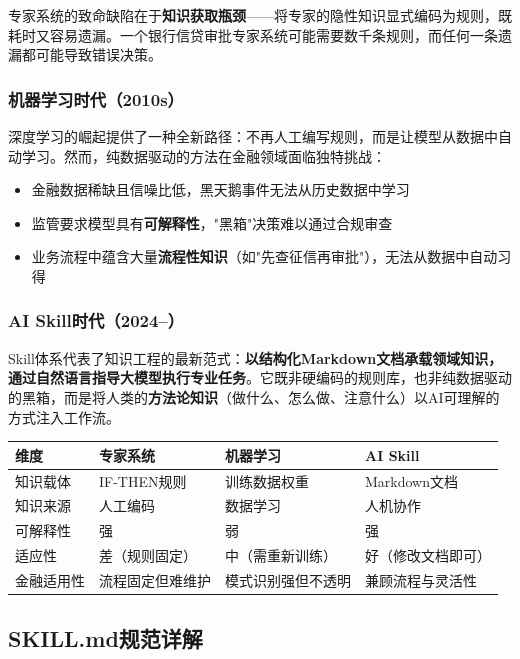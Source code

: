 专家系统的致命缺陷在于\textbf{知识获取瓶颈}——将专家的隐性知识显式编码为规则，既耗时又容易遗漏。一个银行信贷审批专家系统可能需要数千条规则，而任何一条遗漏都可能导致错误决策。

\subsubsection{机器学习时代（2010s）}

深度学习的崛起提供了一种全新路径：不再人工编写规则，而是让模型从数据中自动学习。然而，纯数据驱动的方法在金融领域面临独特挑战：
\begin{itemize}[leftmargin=2em]
  \item 金融数据稀缺且信噪比低，黑天鹅事件无法从历史数据中学习
  \item 监管要求模型具有\textbf{可解释性}，"黑箱"决策难以通过合规审查
  \item 业务流程中蕴含大量\textbf{流程性知识}（如"先查征信再审批"），无法从数据中自动习得
\end{itemize}

\subsubsection{AI Skill时代（2024--）}

Skill体系代表了知识工程的最新范式：\textbf{以结构化Markdown文档承载领域知识，通过自然语言指导大模型执行专业任务}。它既非硬编码的规则库，也非纯数据驱动的黑箱，而是将人类的\textbf{方法论知识}（做什么、怎么做、注意什么）以AI可理解的方式注入工作流。

\begin{theorybox}[知识工程三大范式对比]
\begin{tabular}{lp{3.5cm}p{3.5cm}p{3.5cm}}
\toprule
\textbf{维度} & \textbf{专家系统} & \textbf{机器学习} & \textbf{AI Skill} \\
\midrule
知识载体 & IF-THEN规则 & 训练数据权重 & Markdown文档 \\
知识来源 & 人工编码 & 数据学习 & 人机协作 \\
可解释性 & 强 & 弱 & 强 \\
适应性 & 差（规则固定） & 中（需重新训练） & 好（修改文档即可） \\
金融适用性 & 流程固定但难维护 & 模式识别强但不透明 & 兼顾流程与灵活性 \\
\bottomrule
\end{tabular}
\end{theorybox}

\subsection{SKILL.md规范详解}

